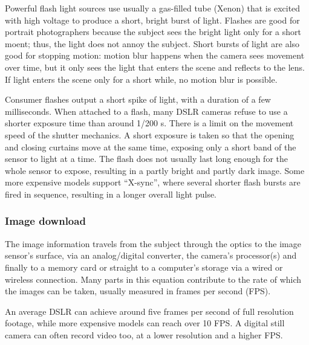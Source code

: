 Powerful flash light sources use usually a gas-filled tube (Xenon) that is excited with high voltage to produce a short, bright burst of light.
Flashes are good for portrait photographers because the subject sees the bright light only for a short moent; thus, the light does not annoy the subject.
Short bursts of light are also good for stopping motion: motion blur happens when the camera sees movement over time, but it only sees the light that enters the scene and reflects to the lens.
If light enters the scene only for a short while, no motion blur is possible.

Consumer flashes output a short spike of light, with a duration of a few milliseconds.
When attached to a flash, many DSLR cameras refuse to use a shorter exposure time than around 1/200 s.
There is a limit on the movement speed of the shutter mechanics.
A short exposure is taken so that the opening and closing curtains move at the same time, exposing only a short band of the sensor to light at a time.
The flash does not usually last long enough for the whole sensor to expose, resulting in a partly bright and partly dark image.
Some more expensive models support ``X-sync'', where several shorter flash bursts are fired in sequence, resulting in a longer overall light pulse.






\subsubsection{Image download} %


The image information travels from the subject through the optics to the image sensor's surface, via an analog/digital converter, the camera's processor(s) and finally to a memory card or straight to a computer's storage via a wired or wireless connection.
Many parts in this equation contribute to the rate of which the images can be taken, usually measured in frames per second (FPS).


An average DSLR can achieve around five frames per second of full resolution footage, while more expensive models can reach over 10 FPS.
A digital still camera can often record video too, at a lower resolution and a higher FPS.

